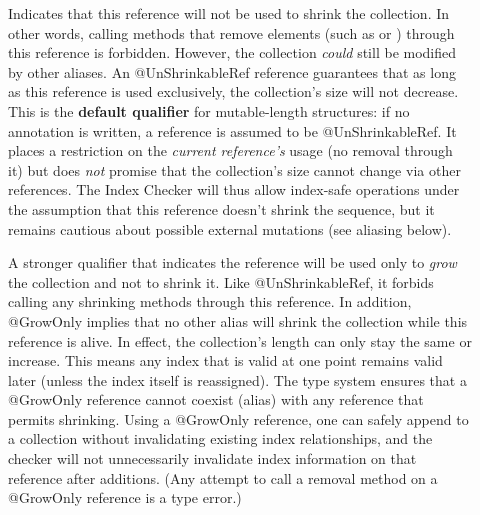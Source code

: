 \begin{description}
\item[]
  Indicates that this reference will not be used to shrink the collection. In other
  words, calling methods that remove elements (such as  or )
  through this reference is forbidden. However, the collection \emph{could} still be
  modified by other aliases. An @UnShrinkableRef reference guarantees that as long as
  this reference is used exclusively, the collection’s size will not decrease. This is
  the \textbf{default qualifier} for mutable-length structures: if no annotation is written,
  a reference is assumed to be @UnShrinkableRef. It places a restriction on the
  \emph{current reference’s} usage (no removal through it) but does \emph{not} promise
  that the collection’s size cannot change via other references. The Index Checker will
  thus allow index-safe operations under the assumption that this reference doesn’t shrink
  the sequence, but it remains cautious about possible external mutations (see aliasing below).

\item[]
  A stronger qualifier that indicates the reference will be used only to \emph{grow}
  the collection and not to shrink it. Like @UnShrinkableRef, it forbids calling any
  shrinking methods through this reference. In addition, @GrowOnly implies that no other
  alias will shrink the collection while this reference is alive. In effect, the
  collection’s length can only stay the same or increase. This means any index that is
  valid at one point remains valid later (unless the index itself is reassigned). The
  type system ensures that a @GrowOnly reference cannot coexist (alias) with any reference
  that permits shrinking. Using a @GrowOnly reference, one can safely append to a collection
  without invalidating existing index relationships, and the checker will not unnecessarily
  invalidate index information on that reference after additions. (Any attempt to call a
  removal method on a @GrowOnly reference is a type error.)


\end{description}
